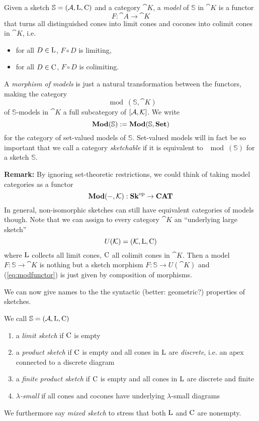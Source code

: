 \begin{Definition}
Given a sketch $\mathbb S = (\mathcal{A}, \textrm{L}, \textrm{C})$ and a category $\cat K$, a \emph{model} of $\mathbb S$ in $\cat K$ is a functor
\[ F : \cat A \to \cat K \]
that turns all distinguished cones into limit cones and cocones into colimit cones in $\cat K$, i.e. \begin{itemize}
\item for all $D \in \textrm{L}$, $F \circ D$ is limiting,
\item for all $D \in \textrm{C}$, $F \circ D$ is colimiting.
\end{itemize}
A \emph{morphism of models} is just a natural transformation between the functors, making the category \[ \mod(\mathbb S, \cat K) \]
of $\mathbb S$-models in $\cat K$ a full subcategory of $[\mathcal{A},\mathcal{K}]$. We write
\[ \mathbf{Mod}(\mathbb S) := \mathbf{Mod}(\mathbb S, \mathbf{Set}) \]
for the category of set-valued models of $\mathbb S$. Set-valued models will in fact be so important that we call a category \emph{sketchable} if it is equivalent to $\mod(\mathbb S)$ for a sketch $\mathbb S$.
\end{Definition}

\textbf{Remark: } By ignoring set-theoretic restrictions, we could think of taking model categories as a functor
\begin{equation}
\label{eq:modfunctor} \mathbf{Mod}(-, \mathcal{K}) : \mathbf{Sk}^{\textrm{op}} \to \mathbf{CAT}
\end{equation}
In general, non-isomorphic sketches can still have equivalent categories of models though. Note that we can assign to every category $\cat K$ an ``underlying large sketch'' 
\[ U(\mathcal{K}) = (\mathcal{K}, \textrm{L}, \textrm{C}) \]
where $\textrm{L}$ collects all limit cones, $\textrm{C}$ all colimit cones in $\cat K$. Then a model $F : \mathbb S \to \cat K$ is nothing but a sketch morphism $F : \mathbb S \to U(\cat K)$ and (\ref{eq:modfunctor}) is just given by composition of morphisms. 

We can now give names to the the syntactic (better: geometric?) properties of sketches.
\begin{Definition}
We call $\mathbb S = (\mathcal{A}, \textrm{L}, \textrm{C})$
\begin{enumerate}
\item a \emph{limit sketch} if $\textrm{C}$ is empty
\item a \emph{product sketch} if $\textrm{C}$ is empty and all cones in $\textrm{L}$ are \emph{discrete}, i.e. an apex connected to a discrete diagram
\item a \emph{finite product sketch} if $\textrm{C}$ is empty and all cones in $\textrm{L}$ are discrete and finite
\item \emph{$\lambda$-small} if all cones and cocones have underlying $\lambda$-small diagrams
\end{enumerate}
We furthermore say \emph{mixed sketch} to stress that both $\textrm{L}$ and $\textrm{C}$ are nonempty.
\end{Definition}

